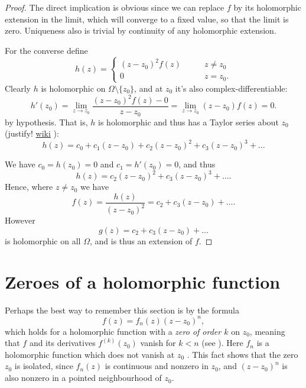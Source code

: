 \begin{proof}
The direct implication is obvious since we can replace $f$ by
its holomorphic extension in the limit, which will converge to a fixed
value, so that the limit is zero. Uniqueness also is trivial
by continuity of any holomorphic extension.

For the converse define
$$
h(z)=\begin{cases}
(z-z_0)^2f(z)\qquad &z \neq z_0 \\
0\qquad &z=z_0.
\end{cases}
$$
Clearly $h$ is holomorphic on $\Omega\setminus\{z_0\}$,
and at $z_0$ it's also complex-differentiable:
$$
h'(z_0)=\lim_{z \to z_0} \frac{(z-z_0)^2f(z)-0}{z-z_0}
=\lim_{z\to z_0}(z-z_0)f(z)=0.
$$
by hypothesis. That is, $h$ is holomorphic
and thus has a Taylor series about $z_0$ (justify!
\href{https://en.wikipedia.org/wiki/Analyticity_of_holomorphic_functions}{wiki}
):
$$
h(z)=c_0+c_1(z-z_0)+c_2(z-z_0)^2+c_3(z-z_0)^3+\ldots
$$

We have $c_0=h(z_0)=0$ and $c_1=h'(z_0)=0$, and thus
$$
h(z)=c_2(z-z_0)^2+c_3(z-z_0)^3+\ldots.
$$
Hence, where $z\neq z_0$ we have
$$
f(z)=\frac{h(z)}{(z-z_0)^2}=c_2+c_3(z-z_0)+\ldots.
$$
However
$$
g(z)=c_2+c_3(z-z_0)+\ldots
$$
is holomorphic on all $\Omega$, and is thus an extension of $f$.
\end{proof}

\section{Zeroes of a holomorphic function}
\label{section-zeroes}

\noindent
Perhaps the best way to remember this section is by the formula
\begin{equation}
\label{equation-zero}
f(z)=f_n(z)(z-z_0)^n,
\end{equation}
which holds for a holomorphic function with a {\it zero of order $k$} on
$z_0$, meaning that $f$ and its derivatives $f^{(k)}(z_0)$ vanish
for $k<n$ (see \cite[p. 126]{Ahlfors}).
Here $f_n$ is a holomorphic function which does not vanish at $z_0$ .
This fact shows that the zero $z_0$ is isolated,
since $f_n(z)$ is continuous and nonzero in $z_0$,
and $(z-z_0)^n$ is also nonzero in a pointed neighbourhood of $z_0$.
 
